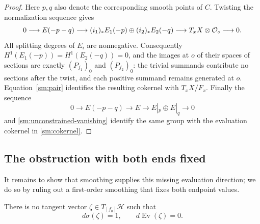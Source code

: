 \begin{proof}
Here $p,q$ also denote the corresponding smooth points of $C$.
Twisting the normalization sequence gives
\[
0\longrightarrow E(-p-q)
\longrightarrow(i_1)_*E_1(-p)\oplus(i_2)_*E_2(-q)
\longrightarrow T_xX\otimes\mathcal O_o\longrightarrow0.
\]
All splitting degrees of $E_i$ are nonnegative. Consequently
$H^1(E_1(-p))=H^1(E_2(-q))=0$, and the images at $o$ of
their spaces of sections are exactly $(P_{f_1})_0$ and
$(P_{f_2})_0$: the trivial summands contribute no sections after
the twist, and each positive summand remains generated at $o$.
Equation~\eqref{sm:pair} identifies the resulting cokernel
with $T_xX/F_x$. Finally the sequence
\[
0\longrightarrow E(-p-q)\longrightarrow E
\longrightarrow E|_p\oplus E|_q\longrightarrow0
\]
and \eqref{sm:unconstrained-vanishing} identify the same group
with the evaluation cokernel in \eqref{sm:cokernel}.
\end{proof}

\subsection{The obstruction with both ends fixed}

It remains to show that smoothing supplies this missing evaluation
direction; we do so by ruling out a first-order smoothing that fixes
both endpoint values.

\begin{lemma}\label{sm:fixed-ends}
There is no tangent vector $\zeta\in T_{[f_0]}\mathscr H$
such that
\[
d\sigma(\zeta)=1,\qquad d\operatorname{Ev}(\zeta)=0.
\]
\end{lemma}

